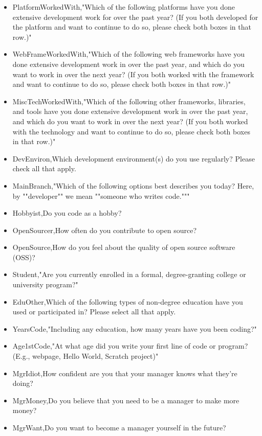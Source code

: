 \begin{appendices}
\begin{itemize}
        \item PlatformWorkedWith,"Which of the following platforms have you done extensive development work for over the past year?   (If you both developed for the platform and want to continue to do so, please check both boxes in that row.)"
        \item WebFrameWorkedWith,"Which of the following web frameworks have you done extensive development work in over the past year, and which do you want to work in over the next year? (If you both worked with the framework and want to continue to do so, please check both boxes in that row.)"
        \item MiscTechWorkedWith,"Which of the following other frameworks, libraries, and tools have you done extensive development work in over the past year, and which do you want to work in over the next year? (If you both worked with the technology and want to continue to do so, please check both boxes in that row.)"
        \item DevEnviron,Which development environment(s) do you use regularly? Please check all that apply.
        \item MainBranch,"Which of the following options best describes you today? Here, by ""developer"" we mean ""someone who writes code."""
        \item Hobbyist,Do you code as a hobby?
        \item OpenSourcer,How often do you contribute to open source?
        \item OpenSource,How do you feel about the quality of open source software (OSS)?
        \item Student,"Are you currently enrolled in a formal, degree-granting college or university program?"
        \item EduOther,Which of the following types of non-degree education have you used or participated in? Please select all that apply.
        \item YearsCode,"Including any education, how many years have you been coding?"
        \item Age1stCode,"At what age did you write your first line of code or program? (E.g., webpage, Hello World, Scratch project)"
        \item MgrIdiot,How confident are you that your manager knows what they’re doing?
        \item MgrMoney,Do you believe that you need to be a manager to make more money?
        \item MgrWant,Do you want to become a manager yourself in the future?

\end{itemize}
\end{appendices}
